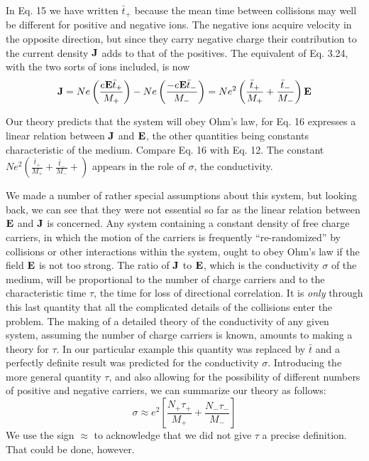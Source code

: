 In Eq. 15 we have written $\bar{t}_+$ because the mean time between collisions
may well be different for positive and negative ions. The negative
ions acquire velocity in the opposite direction, but since they
carry negative charge their contribution to the current density $\mathbf{J}$ adds
to that of the positives. The equivalent of Eq. 3.24, with the two sorts
of ions included, is now
\begin{equation}
  \mathbf{J} = Ne\left(\frac{e\mathbf{E}\bar{t}_+}{M_+}\right)
          -Ne\left(\frac{-e\mathbf{E}\bar{t}_-}{M_-}\right)
         =Ne^2\left(\frac{\bar{t}_+}{M_+}+\frac{\bar{t}_-}{M_-}\right)\mathbf{E}
\end{equation}

Our theory predicts that the system will obey Ohm's law, for
Eq. 16 expresses a linear relation between $\mathbf{J}$ and $\mathbf{E}$, the other quantities
being constants characteristic of the medium. Compare Eq. 16
with Eq. 12. The constant $Ne^2\left(\frac{\bar{t}_+}{M_+}+\frac{\bar{t}_-}{M_-}+\right)$
appears in the role of $\sigma$, the conductivity.

We made a number of rather special assumptions about this system,
but looking back, we can see that they were not essential so far
as the linear relation between $\mathbf{E}$ and $\mathbf{J}$ is concerned. Any system
containing a constant density of free charge carriers, in which the
motion of the carriers is frequently ``re-randomized'' by collisions or
other interactions within the system, ought to obey Ohm's law if the
field $\mathbf{E}$ is not too strong. The ratio of $\mathbf{J}$ to $\mathbf{E}$, which is the conductivity
$\sigma$ of the medium, will be proportional to the number of charge
carriers and to the characteristic time $\tau$, the time for loss of directional
correlation. It is \emph{only} through this last quantity that all the
complicated details of the collisions enter the problem. The making
of a detailed theory of the conductivity of any given system, assuming
the number of charge carriers is known, amounts to making a theory
for $\tau$. In our particular example this quantity was replaced by $\bar{t}$ and
a perfectly definite result was predicted for the conductivity $\sigma$. Introducing
the more general quantity $\tau$, and also allowing for the
possibility of different numbers of positive and negative carriers, we
can summarize our theory as follows:
\begin{equation}
  \sigma \approx e^2\left[\frac{N_+\tau_+}{M_+}+\frac{N_-\tau_-}{M_-}\right]
\end{equation}
We use the sign $\approx$ to acknowledge that we did not give $\tau$ a precise
definition. That could be done, however.

